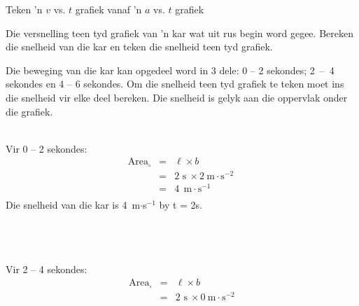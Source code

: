 \begin{wex}{Teken  'n $v$ vs. $t$ grafiek vanaf  'n $a$ vs. $t$ grafiek}
{Die versnelling teen tyd grafiek van  'n kar wat uit rus begin word gegee. Bereken die snelheid van die kar en teken die snelheid teen tyd grafiek.
\begin{center}
\end{center}}
{
Die beweging van die kar kan opgedeel word in 3 dele: 0 -- 2 sekondes; 2~--~4 sekondes en 4 -- 6 sekondes. Om die snelheid teen tyd grafiek te teken moet ins die snelheid vir elke deel bereken. Die snelheid is gelyk aan die oppervlak onder die grafiek.\\
\\
\begin{minipage}{0.3\textwidth}
Vir 0 -- 2 sekondes:
\begin{eqnarray*}
\text{Area}_{\square} &=& \ell \times b\\
&=& 2\text{~s}\ \times 2~\text{m}\cdot \text{s}^{-2}\ \\
&=&4\ ~\text{m}\cdot \text{s}^{-1}\\
\end{eqnarray*}
Die snelheid van die kar is 4~m$\cdot$s$^{-1}$ by t = 2s.\\
\\
\\
\\
\end{minipage}
\begin{minipage}{0.03\textwidth}
\begin{center}
\end{center}
\end{minipage}
\begin{minipage}{0.3\textwidth}
Vir 2 -- 4 sekondes:
\begin{eqnarray*}
\text{Area}_{\square} &=& \ell \times b\\
&=& 2\text{~s}\ \times 0~\text{m}\cdot \text{s}^{-2}\\

\end{eqnarray*}
\end{minipage}}
\end{wex}
